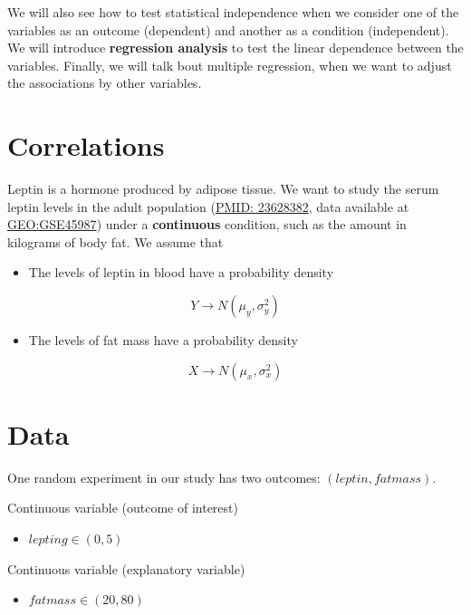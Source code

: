 \documentclass[
]{book}
\providecommand{\tightlist}{%
  \setlength{\itemsep}{0pt}\setlength{\parskip}{0pt}}
\begin{document}
We will also see how to test statistical independence when we consider one of the variables as an outcome (dependent) and another as a condition (independent). We will introduce \textbf{regression analysis} to test the linear dependence between the variables. Finally, we will talk bout multiple regression, when we want to adjust the associations by other variables.

\hypertarget{correlations}{%
\section{Correlations}\label{correlations}}

Leptin is a hormone produced by adipose tissue. We want to study the serum leptin levels in the adult population (\href{https://pubmed.ncbi.nlm.nih.gov/23628382/}{PMID: 23628382}, data available at \href{https://www.ncbi.nlm.nih.gov/geo/query/acc.cgi?acc=GSE45987}{GEO:GSE45987}) under a \textbf{continuous} condition, such as the amount in kilograms of body fat. We assume that

\begin{itemize}
\tightlist
\item
  The levels of leptin in blood have a probability density
\end{itemize}

\[Y \rightarrow N(\mu_y, \sigma_y^2)\]

\begin{itemize}
\tightlist
\item
  The levels of fat mass have a probability density
\end{itemize}

\[X \rightarrow N(\mu_x, \sigma_x^2)\]

\hypertarget{data-5}{%
\section{Data}\label{data-5}}

One random experiment in our study has two outcomes: \((leptin, fatmass)\).

Continuous variable (outcome of interest)

\begin{itemize}
\tightlist
\item
  \(lepting \in (0, 5)\)
\end{itemize}

Continuous variable (explanatory variable)

\begin{itemize}
\tightlist
\item
  \(fatmass \in (20,80)\)
\end{itemize}
\end{document}
